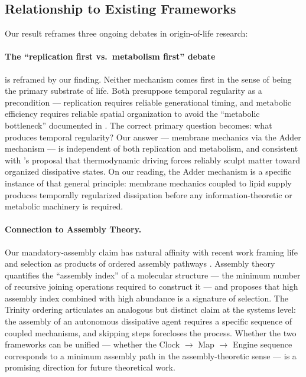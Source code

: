 \documentclass[11pt,letterpaper]{article}
\begin{document}
\subsection{Relationship to Existing Frameworks}

Our result reframes three ongoing debates in origin-of-life research:

\paragraph{The ``replication first vs.\ metabolism first'' debate} \citep{joyce2002antiquity,shapiro2006small,pross2012whatislife} is reframed by our finding. Neither mechanism comes first in the sense of being the primary substrate of life. Both presuppose temporal regularity as a precondition --- replication requires reliable generational timing, and metabolic efficiency requires reliable spatial organization to avoid the ``metabolic bottleneck'' documented in \citet{farina2025engine}. The correct primary question becomes: what produces temporal regularity? Our answer --- membrane mechanics via the Adder mechanism \citep{chen2004kinetic,zhu2009coupled,jun2015cellsize} --- is independent of both replication and metabolism, and consistent with \citeauthor{england2013statistical}'s \citeyearpar{england2013statistical} proposal that thermodynamic driving forces reliably sculpt matter toward organized dissipative states. On our reading, the Adder mechanism is a specific instance of that general principle: membrane mechanics coupled to lipid supply produces temporally regularized dissipation before any information-theoretic or metabolic machinery is required.

\paragraph{Connection to Assembly Theory.} Our mandatory-assembly claim has natural affinity with recent work framing life and selection as products of ordered assembly pathways \citep{sharma2023assembly,marshall2021identifying}. Assembly theory quantifies the ``assembly index'' of a molecular structure --- the minimum number of recursive joining operations required to construct it --- and proposes that high assembly index combined with high abundance is a signature of selection. The Trinity ordering articulates an analogous but distinct claim at the systems level: the assembly of an autonomous dissipative agent requires a specific sequence of coupled mechanisms, and skipping steps forecloses the process. Whether the two frameworks can be unified --- whether the Clock $\to$ Map $\to$ Engine sequence corresponds to a minimum assembly path in the assembly-theoretic sense --- is a promising direction for future theoretical work.
\end{document}

